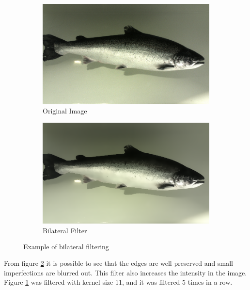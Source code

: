\begin{figure}[h]
    \centering
    \begin{subfigure}{0.5\textwidth}
        \centering
        \includegraphics[width=.98\linewidth]{images/literature/original_fish}
        \caption{Original Image}
    \end{subfigure}%
    \begin{subfigure}{.5\textwidth}
        \centering
        \includegraphics[width=.98\linewidth]{images/literature/bilateral}
        \caption{Bilateral Filter}
        \label{fig:bilateral_filter_b}
    \end{subfigure}
    \caption{Example of bilateral filtering}
    \label{fig:bilateral_filter}
\end{figure}

From figure \ref{fig:bilateral_filter} it is possible to see that the edges are well preserved and small imperfections are blurred out. This filter also increases the intensity in the image. Figure \ref{fig:bilateral_filter_b} was filtered with kernel size 11, and it was filtered 5 times in a row.



